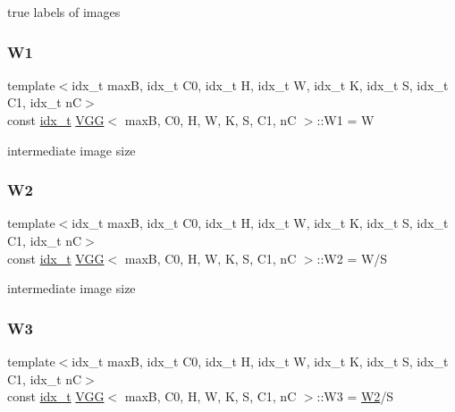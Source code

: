 true labels of images \mbox{\label{structVGG_a01305ab6d90c95eb50c45352203b07e0}} 
\subsubsection{\texorpdfstring{W1}{W1}}
{\footnotesize\ttfamily template$<$idx\+\_\+t maxB, idx\+\_\+t C0, idx\+\_\+t H, idx\+\_\+t W, idx\+\_\+t K, idx\+\_\+t S, idx\+\_\+t C1, idx\+\_\+t nC$>$ \\
const \hyperlink{vgg__util_8h_a8e93478a00e685bea5e6a3f617bf03a3}{idx\+\_\+t} \hyperlink{structVGG}{V\+GG}$<$ maxB, C0, H, W, K, S, C1, nC $>$\+::W1 = W\hspace{0.3cm}{\ttfamily [static]}}

intermediate image size \mbox{\label{structVGG_ac4a4d00b5e2ee41b1d4e8861bbc6c499}} 
\subsubsection{\texorpdfstring{W2}{W2}}
{\footnotesize\ttfamily template$<$idx\+\_\+t maxB, idx\+\_\+t C0, idx\+\_\+t H, idx\+\_\+t W, idx\+\_\+t K, idx\+\_\+t S, idx\+\_\+t C1, idx\+\_\+t nC$>$ \\
const \hyperlink{vgg__util_8h_a8e93478a00e685bea5e6a3f617bf03a3}{idx\+\_\+t} \hyperlink{structVGG}{V\+GG}$<$ maxB, C0, H, W, K, S, C1, nC $>$\+::W2 = W/S\hspace{0.3cm}{\ttfamily [static]}}

intermediate image size \mbox{\label{structVGG_ad3bde49e961175621e0937584dae0af0}} 
\subsubsection{\texorpdfstring{W3}{W3}}
{\footnotesize\ttfamily template$<$idx\+\_\+t maxB, idx\+\_\+t C0, idx\+\_\+t H, idx\+\_\+t W, idx\+\_\+t K, idx\+\_\+t S, idx\+\_\+t C1, idx\+\_\+t nC$>$ \\
const \hyperlink{vgg__util_8h_a8e93478a00e685bea5e6a3f617bf03a3}{idx\+\_\+t} \hyperlink{structVGG}{V\+GG}$<$ maxB, C0, H, W, K, S, C1, nC $>$\+::W3 = \hyperlink{structVGG_ac4a4d00b5e2ee41b1d4e8861bbc6c499}{W2}/S\hspace{0.3cm}{\ttfamily [static]}}

